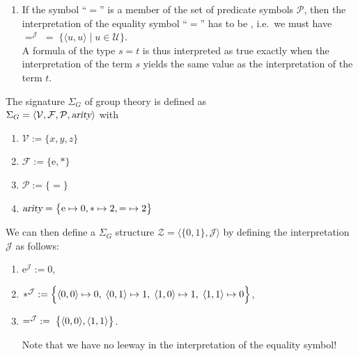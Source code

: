 \begin{Definition}[Structure]
\begin{enumerate}
\begin{enumerate}
              The idea is that an atomic formula of the form $p(t_1, \cdots, t_n)$
              is interpreted as $\texttt{true}$ exactly if the interpretation of the tuple
              $\langle t_1, \cdots, t_n \rangle$ is an element of the set $p^\mathcal{J}$.
        \item If the symbol ``$=$'' is a member of the set of predicate symbols $\mathcal{P}$, then the
              interpretation of  the equality symbol ``$=$'' has to be , i.e.~we must have
              \\[0.2cm]
              \hspace*{1.3cm}  
              $=^\mathcal{J} \;=\; \bigl\{ \langle u, u \rangle \mid u \in \mathcal{U} \bigr\}$.
              \\[0.2cm]
              A formula of the type $s = t$ is thus interpreted as true 
              exactly when the interpretation of the term $s$ yields the same value as the interpretation of
              the term $t$. 
              \eox
        \end{enumerate}
    \end{enumerate}
\end{Definition}

\exampleEng
The signature $\Sigma_G$ of group theory is defined as \\[0.2cm]
\hspace*{1.3cm} $\Sigma_G = \langle \mathcal{V}, \mathcal{F}, \mathcal{P},\textsl{arity}\rangle$ 
\quad with
\begin{enumerate}
\item $\mathcal{V} := \{ x, y, z \}$
\item $\mathcal{F} := \{ \mathrm{e}, * \}$
\item $\mathcal{P} := \{ \mathtt{=} \}$
\item $\textsl{arity} = \bigl\{ \mathrm{e} \mapsto 0, * \mapsto 2, \mathtt{=} \mapsto 2\bigr\}$
\end{enumerate}
We can then define a $\Sigma_G$ structure $\mathcal{Z} = \langle \{0,1\},\mathcal{J}\rangle$ 
by defining the interpretation $\mathcal{J}$ 
as follows:
\begin{enumerate}
\item $\mathrm{e}^\mathcal{J} := 0$,
\item $*^\mathcal{J} := \Bigl\{ \pair(0,0) \mapsto 0,\;
                                 \pair(0,1) \mapsto 1,\;
                                 \pair(1,0) \mapsto 1,\;
                                 \pair(1,1) \mapsto 0 \Bigr\}$,
\item $=^\mathcal{J} \;:=\; \bigl\{ \pair(0,0), \pair(1,1) \bigr\}$.
                                 
      Note that we have no leeway in the interpretation of the equality symbol! \eox
\end{enumerate}

